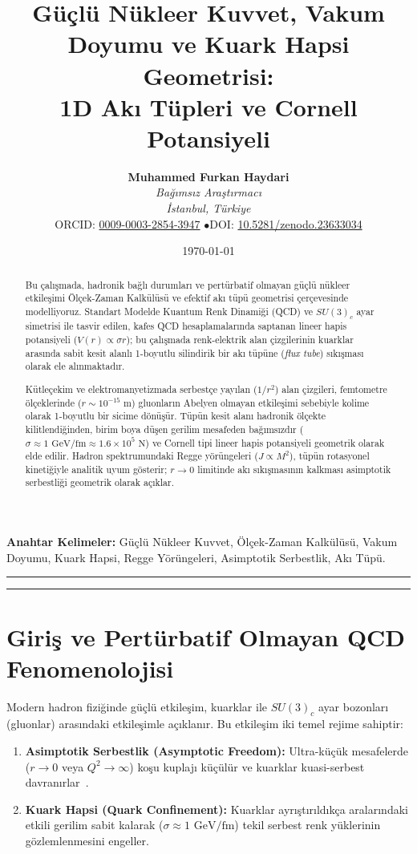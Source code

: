 \documentclass[11pt,a4paper]{article}
\title{\textbf{Güçlü Nükleer Kuvvet, Vakum Doyumu ve Kuark Hapsi Geometrisi: \\ 1D Akı Tüpleri ve Cornell Potansiyeli}}
\author{
    \textbf{Muhammed Furkan Haydari} \\
    \textit{Bağımsız Araştırmacı} \\
    \textit{İstanbul, Türkiye} \\
    \small ORCID: \href{https://orcid.org/0009-0003-2854-3947}{0009-0003-2854-3947} \quad$\bullet$\quad \small DOI: \href{https://doi.org/10.5281/zenodo.23633034}{10.5281/zenodo.23633034}
}
\date{\today}
\begin{document}
\maketitle

\begin{abstract}
    Bu çalışmada, hadronik bağlı durumları ve pertürbatif olmayan güçlü nükleer etkileşimi Ölçek-Zaman Kalkülüsü ve efektif akı tüpü geometrisi çerçevesinde modelliyoruz. Standart Modelde Kuantum Renk Dinamiği (QCD) ve $SU(3)_c$ ayar simetrisi ile tasvir edilen, kafes QCD hesaplamalarında saptanan lineer hapis potansiyeli ($V(r) \propto \sigma r$); bu çalışmada renk-elektrik alan çizgilerinin kuarklar arasında sabit kesit alanlı 1-boyutlu silindirik bir akı tüpüne (\textit{flux tube}) sıkışması olarak ele alınmaktadır.

    Kütleçekim ve elektromanyetizmada serbestçe yayılan ($1/r^2$) alan çizgileri, femtometre ölçeklerinde ($r \sim 10^{-15}\text{ m}$) gluonların Abelyen olmayan etkileşimi sebebiyle kolime olarak 1-boyutlu bir sicime dönüşür. Tüpün kesit alanı hadronik ölçekte kilitlendiğinden, birim boya düşen gerilim mesafeden bağımsızdır ($\sigma \approx 1\text{ GeV/fm} \approx 1.6 \times 10^5\text{ N}$) ve Cornell tipi lineer hapis potansiyeli geometrik olarak elde edilir. Hadron spektrumundaki Regge yörüngeleri ($J \propto M^2$), tüpün rotasyonel kinetiğiyle analitik uyum gösterir; $r \to 0$ limitinde akı sıkışmasının kalkması asimptotik serbestliği geometrik olarak açıklar.
\end{abstract}

\vspace{1em}
\noindent\textbf{Anahtar Kelimeler:} Güçlü Nükleer Kuvvet, Ölçek-Zaman Kalkülüsü, Vakum Doyumu, Kuark Hapsi, Regge Yörüngeleri, Asimptotik Serbestlik, Akı Tüpü.

\vspace{1em}
\hrule
\vspace{0.8em}
\tableofcontents
\vspace{0.8em}
\hrule
\vspace{1.5em}

\section{Giriş ve Pertürbatif Olmayan QCD Fenomenolojisi}
\label{sec:giris}

Modern hadron fiziğinde güçlü etkileşim, kuarklar ile $SU(3)_c$ ayar bozonları (gluonlar) arasındaki etkileşimle açıklanır. Bu etkileşim iki temel rejime sahiptir:
\begin{enumerate}
    \item \textbf{Asimptotik Serbestlik (Asymptotic Freedom):} Ultra-küçük mesafelerde ($r \to 0$ veya $Q^2 \to \infty$) koşu kuplajı küçülür ve kuarklar kuasi-serbest davranırlar~\cite{gross1973,politzer1973}.
    \item \textbf{Kuark Hapsi (Quark Confinement):} Kuarklar ayrıştırıldıkça aralarındaki etkili gerilim sabit kalarak ($\sigma \approx 1\text{ GeV/fm}$) tekil serbest renk yüklerinin gözlemlenmesini engeller.
\end{enumerate}
\end{document}
